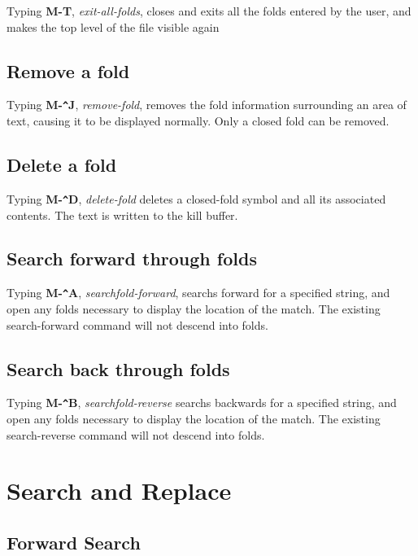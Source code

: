 Typing {\bf M-T}, {\it exit-all-folds}, closes and exits all the folds
entered by the user, and makes the top level of the file visible again

\section{Remove a fold}

Typing {\bf M-\verb+^+J}, {\it remove-fold}, removes the fold
information surrounding  an area of text, causing it to be displayed
normally. Only a closed fold can be removed.

\section{Delete a fold}

Typing {\bf M-\verb+^+D}, {\it delete-fold} deletes a closed-fold
symbol and all its  associated contents. The text is written to the
kill buffer.

\section{Search forward through folds}

Typing {\bf M-\verb+^+A}, {\it searchfold-forward}, searchs forward for
a specified string, and open any folds necessary to display the
location of the match. The existing search-forward command will not
descend into folds.

\section{Search back through folds}

Typing {\bf M-\verb+^+B}, {\it searchfold-reverse} searchs backwards
for a specified string, and open any folds necessary to display the
location of the match. The existing search-reverse command will not
descend into folds.
\chapter{Search and Replace}

\section{Forward Search}


